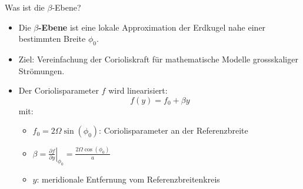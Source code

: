 
\begin{frame}{Was ist die \(\beta\)-Ebene?}
	\begin{itemize}
		\item Die \textbf{\(\beta\)-Ebene} ist eine lokale Approximation der Erdkugel nahe einer bestimmten Breite \(\phi_0\).
		\item Ziel: Vereinfachung der Corioliskraft für mathematische Modelle grossskaliger Strömungen.
		\item Der Coriolisparameter \(f\) wird linearisiert:
		      \[
			      f(y) = f_0 + \beta y
		      \]
		      mit:
		      \begin{itemize}
			      \item \(f_0 = 2\Omega \sin(\phi_0)\): Coriolisparameter an der Referenzbreite
			      \item \(\beta = \left.\frac{\partial f}{\partial y}\right|_{\phi_0} = \frac{2\Omega \cos(\phi_0)}{a}\)
			      \item \(y\): meridionale Entfernung vom Referenzbreitenkreis
		      \end{itemize}
	\end{itemize}
\end{frame}


